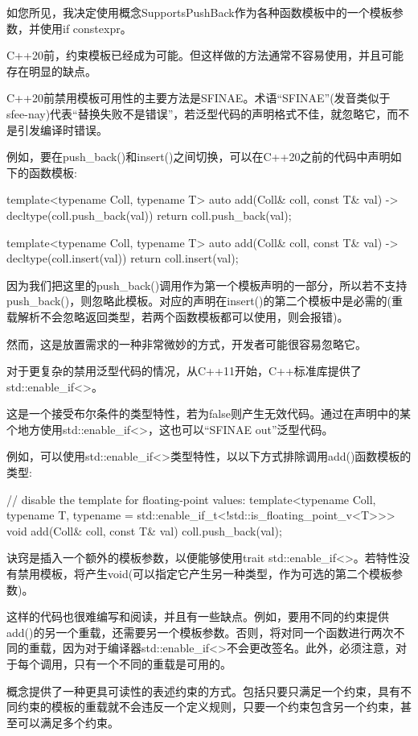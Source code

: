 如您所见，我决定使用概念SupportsPushBack作为各种函数模板中的一个模板参数，并使用if constexpr。


C++20前，约束模板已经成为可能。但这样做的方法通常不容易使用，并且可能存在明显的缺点。


C++20前禁用模板可用性的主要方法是SFINAE。术语“SFINAE”(发音类似于sfee-nay)代表“替换失败不是错误”，若泛型代码的声明格式不佳，就忽略它，而不是引发编译时错误。

例如，要在push\_back()和insert()之间切换，可以在C++20之前的代码中声明如下的函数模板:

\begin{cpp}
template<typename Coll, typename T>
auto add(Coll& coll, const T& val) -> decltype(coll.push_back(val))
{
	return coll.push_back(val);
}

template<typename Coll, typename T>
auto add(Coll& coll, const T& val) -> decltype(coll.insert(val))
{
	return coll.insert(val);
}
\end{cpp}

因为我们把这里的push\_back()调用作为第一个模板声明的一部分，所以若不支持push\_back()，则忽略此模板。对应的声明在insert()的第二个模板中是必需的(重载解析不会忽略返回类型，若两个函数模板都可以使用，则会报错)。

然而，这是放置需求的一种非常微妙的方式，开发者可能很容易忽略它。


对于更复杂的禁用泛型代码的情况，从C++11开始，C++标准库提供了std::enable\_if<>。

这是一个接受布尔条件的类型特性，若为false则产生无效代码。通过在声明中的某个地方使用std::enable\_if<>，这也可以“SFINAE out”泛型代码。

例如，可以使用std::enable\_if<>类型特性，以以下方式排除调用add()函数模板的类型:

\begin{cpp}
// disable the template for floating-point values:
template<typename Coll, typename T,
typename = std::enable_if_t<!std::is_floating_point_v<T>>>
void add(Coll& coll, const T& val)
{
	coll.push_back(val);
}
\end{cpp}

诀窍是插入一个额外的模板参数，以便能够使用trait std::enable\_if<>。若特性没有禁用模板，将产生void(可以指定它产生另一种类型，作为可选的第二个模板参数)。

这样的代码也很难编写和阅读，并且有一些缺点。例如，要用不同的约束提供add()的另一个重载，还需要另一个模板参数。否则，将对同一个函数进行两次不同的重载，因为对于编译器std::enable\_if<>不会更改签名。此外，必须注意，对于每个调用，只有一个不同的重载是可用的。

概念提供了一种更具可读性的表述约束的方式。包括只要只满足一个约束，具有不同约束的模板的重载就不会违反一个定义规则，只要一个约束包含另一个约束，甚至可以满足多个约束。




